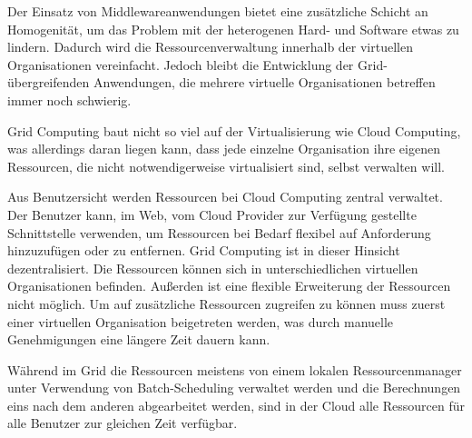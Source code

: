 Der Einsatz von Middlewareanwendungen bietet eine zusätzliche Schicht an Homogenität, um das Problem mit der heterogenen Hard- und Software etwas zu lindern. Dadurch wird die Ressourcenverwaltung innerhalb der virtuellen Organisationen vereinfacht. Jedoch bleibt die Entwicklung der Grid-übergreifenden Anwendungen, die mehrere virtuelle Organisationen betreffen immer noch schwierig.\cite{McEvoy:2008:UCA:1462704.1462715}

Grid Computing baut nicht so viel auf der Virtualisierung wie Cloud Computing, was allerdings daran liegen kann, dass jede einzelne Organisation ihre eigenen Ressourcen, die nicht notwendigerweise virtualisiert sind, selbst verwalten will\cite{360-degree-compared}. 

Aus Benutzersicht werden Ressourcen bei Cloud Computing zentral verwaltet.
Der Benutzer kann, im Web, vom Cloud Provider zur Verfügung gestellte Schnittstelle verwenden,
um Ressourcen bei Bedarf flexibel auf Anforderung hinzuzufügen oder zu entfernen.
Grid Computing ist in dieser Hinsicht dezentralisiert. Die Ressourcen können sich in unterschiedlichen virtuellen Organisationen befinden. Außerden ist eine flexible Erweiterung der Ressourcen nicht möglich. Um auf zusätzliche Ressourcen zugreifen zu können muss zuerst einer virtuellen Organisation beigetreten werden, was durch manuelle Genehmigungen eine längere Zeit dauern kann.

Während im Grid die Ressourcen meistens von einem lokalen Ressourcenmanager unter Verwendung von Batch-Scheduling verwaltet werden und die Berechnungen eins nach dem anderen abgearbeitet werden, sind in der Cloud alle Ressourcen für alle Benutzer zur gleichen Zeit verfügbar\cite{360-degree-compared}.



